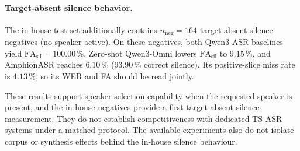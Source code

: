 \paragraph{Target-absent silence behavior.}
The in-house test set additionally contains $n_\text{neg}=164$
target-absent silence negatives (no speaker active).
On these negatives, both Qwen3-ASR baselines yield
$\text{FA}_\text{sil}=100.00$\,\%. Zero-shot Qwen3-Omni lowers
$\text{FA}_\text{sil}$ to $9.15$\,\%, and AmphionASR reaches
$6.10$\,\% ($93.90$\,\% correct silence). Its positive-slice miss rate
is $4.13$\,\%, so its WER and FA should be read jointly.

These results support speaker-selection capability when the requested
speaker is present, and the in-house negatives provide a first
target-absent silence measurement. They do not establish competitiveness
with dedicated TS-ASR systems under a matched protocol. The available
experiments also do not isolate corpus or synthesis effects behind the
in-house silence behaviour.
